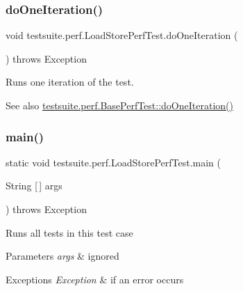 \subsubsection{\texorpdfstring{do\+One\+Iteration()}{doOneIteration()}}
{\footnotesize\ttfamily void testsuite.\+perf.\+Load\+Store\+Perf\+Test.\+do\+One\+Iteration (\begin{DoxyParamCaption}{ }\end{DoxyParamCaption}) throws Exception\hspace{0.3cm}{\ttfamily [protected]}}

Runs one iteration of the test.

\begin{DoxySeeAlso}{See also}
\mbox{\hyperlink{classtestsuite_1_1perf_1_1_base_perf_test_ac9682520790f17d153ad993c7bdf5bf4}{testsuite.\+perf.\+Base\+Perf\+Test\+::do\+One\+Iteration()}} 
\end{DoxySeeAlso}
\mbox{\label{classtestsuite_1_1perf_1_1_load_store_perf_test_ab6e6a7c9d6a4facf8b8df79d201d8837}} 
\subsubsection{\texorpdfstring{main()}{main()}}
{\footnotesize\ttfamily static void testsuite.\+perf.\+Load\+Store\+Perf\+Test.\+main (\begin{DoxyParamCaption}\item[{String \mbox{[}$\,$\mbox{]}}]{args }\end{DoxyParamCaption}) throws Exception\hspace{0.3cm}{\ttfamily [static]}}

Runs all tests in this test case


\begin{DoxyParams}{Parameters}
{\em args} & ignored\\
\hline
\end{DoxyParams}

\begin{DoxyExceptions}{Exceptions}
{\em Exception} & if an error occurs \\
\hline
\end{DoxyExceptions}
\mbox{\label{classtestsuite_1_1perf_1_1_load_store_perf_test_a2c23eb5745202ad5793e966752a87ab7}} 

